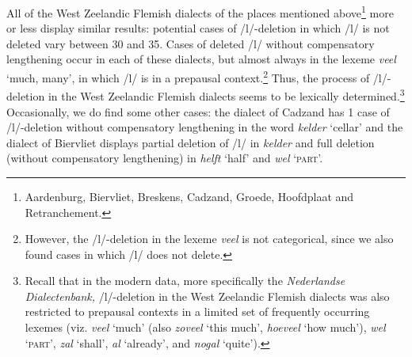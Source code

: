 \documentclass[output=paper,hidelinks,draftmode]{langscibook}
\begin{document}
\largerpage
All of the West Zeelandic Flemish dialects of the places mentioned above\footnote{ {Aardenburg, Biervliet, Breskens, Cadzand, Groede, Hoofdplaat and Retranchement.}} more or less display similar results: potential cases of /l/-deletion in which /l/ is not deleted vary between 30 and 35. Cases of deleted /l/ without compensatory lengthening occur in each of these dialects, but almost always in the lexeme \textit{veel} ‘much, many’, in which /l/ is in a prepausal context.\footnote{ {However, the /l/-deletion in the lexeme} {\textit{veel} }{is not categorical, since we also found cases in which /l/ does not delete.}} Thus, the process of /l/-deletion in the West Zeelandic Flemish dialects seems to be lexically determined.\footnote{ {Recall that in the modern data, more specifically the} {\textit{Nederlandse Dialectenbank,}} {/l/-deletion in the West Zeelandic Flemish dialects was also restricted to prepausal contexts in a limited set of frequently occurring lexemes (viz.} {\textit{veel}} {‘much’ (also} {\textit{zoveel}} {‘this much’,} {\textit{hoeveel}} {‘how much’),} {\textit{wel}} {‘\textsc{part}’,} {\textit{zal}} {‘shall’,} {\textit{al}} {‘already’, and} {\textit{nogal}} {‘quite’).}} Occasionally, we do find some other cases: the dialect of Cadzand has 1 case of /l/-deletion without compensatory lengthening in the word \textit{kelder} ‘cellar’ and the dialect of Biervliet displays partial deletion of /l/ in \textit{kelder} and full deletion (without compensatory lengthening) in \textit{helft} ‘half’ and \textit{wel} ‘\textsc{part}’.
\end{document}
